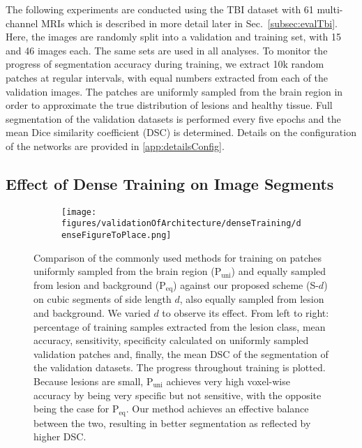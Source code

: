 \documentclass[preprint,authoryear,12pt]{elsarticle}
\begin{document}
The following experiments are conducted using the TBI dataset with 61 multi-channel MRIs which is described in more detail later in Sec.~\ref{subsec:evalTbi}. Here, the images are randomly split into a validation and training set, with 15 and 46 images each. The same sets are used in all analyses. To monitor the progress of segmentation accuracy during training, we extract 10k random patches at regular intervals, with equal numbers extracted from each of the validation images. The patches are uniformly sampled from the brain region in order to approximate the true distribution of lesions and healthy tissue. Full segmentation of the validation datasets is performed every five epochs and the mean Dice similarity coefficient (DSC) is determined. Details on the configuration of the networks are provided in \ref{app:detailsConfig}.

\subsection{Effect of Dense Training on Image Segments}
\label{subsec:valDenseTraining}

\begin{figure}[!h]
\centering
\begin{subfigure}[b]{1.0\textwidth}
\centering
\texttt{[image: figures/validationOfArchitecture/denseTraining/denseFigureToPlace.png]}
\end{subfigure}
\caption{Comparison of the commonly used methods for training on patches uniformly sampled from the brain region (P$_\text{uni}$) and equally sampled from lesion and background (P$_\text{eq}$) against our proposed scheme (S-${d}$) on cubic segments of side length $d$, also equally sampled from lesion and background. We varied $d$ to observe its effect. From left to right: percentage of training samples extracted from the lesion class, mean accuracy, sensitivity, specificity calculated on uniformly sampled validation patches and, finally, the mean DSC of the segmentation of the validation datasets. The progress throughout training is plotted. Because lesions are small, P$_\text{uni}$ achieves very high voxel-wise accuracy by being very specific but not sensitive, with the opposite being the case for P$_\text{eq}$. Our method achieves an effective balance between the two, resulting in better segmentation as reflected by higher DSC.}
\label{fig:denseTrainingExperiment}
\end{figure}
%
 
\end{document}
